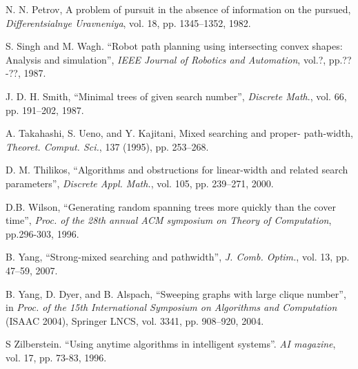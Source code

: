 \documentclass[11pt]{article}\usepackage{amsmath}
\begin{document}
\begin{thebibliography}{99}
N. N. Petrov, A problem of pursuit in the absence of
information on the pursued, \emph{Differentsialnye Uravneniya}, vol. 18, pp.
1345--1352, 1982.

S. Singh and M. Wagh. \textquotedblleft Robot path
planning using intersecting convex shapes: Analysis and
simulation\textquotedblright, \emph{IEEE Journal of Robotics and Automation},
vol.?, pp.??-??, 1987.

J. D. H. Smith, \textquotedblleft Minimal trees of given
search number\textquotedblright, \emph{Discrete Math}., vol. 66, pp. 191--202, 1987.

A. Takahashi, S. Ueno, and Y. Kajitani, Mixed searching
and proper- path-width, \emph{Theoret. Comput. Sci.}, 137 (1995), pp. 253--268.

D. M. Thilikos, \textquotedblleft Algorithms and
obstructions for linear-width and related search parameters\textquotedblright,
\emph{Discrete Appl. Math.}, vol. 105, pp. 239--271, 2000.

D.B. Wilson, \textquotedblleft Generating random spanning
trees more quickly than the cover time\textquotedblright, \emph{Proc. of the
28th annual ACM symposium on Theory of Computation}, pp.296-303, 1996.

B. Yang, \textquotedblleft Strong-mixed searching and
pathwidth\textquotedblright, \emph{J. Comb. Optim.}, vol. 13, pp. 47--59, 2007.

B. Yang, D. Dyer, and B. Alspach, \textquotedblleft Sweeping
graphs with large clique number\textquotedblright, in \emph{Proc. of the 15th
International Symposium on Algorithms and Computation }(ISAAC 2004), Springer
LNCS, vol. 3341, pp. 908--920, 2004.

S Zilberstein. \textquotedblleft Using anytime
algorithms in intelligent systems\textquotedblright. \emph{AI magazine}, vol.
17, pp. 73-83, 1996.
\end{thebibliography}
\end{document}
